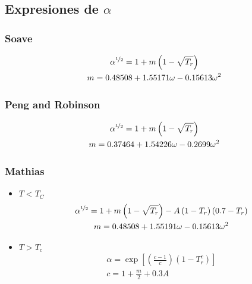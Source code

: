 \subsection{Expresiones de $\alpha$}

\subsubsection{Soave\cite{soave}}

\begin{gather}
	\alpha^{\nicefrac{1}{2}} = 1 + m \left(1-\sqrt{T_r}\right)\\
	m = 0.48508+1.55171\omega-0.15613\omega^2
\end{gather}

\subsubsection{Peng and Robinson \cite{pengRobinson}}


\begin{gather}
	\alpha^{\nicefrac{1}{2}} = 1 + m \left(1-\sqrt{T_r}\right)\\
	m = 0.37464+1.54226\omega-0.2699\omega^2
\end{gather}


\subsubsection{Mathias\cite{mathias} }
\begin{itemize}

\item{$T < T_C$}
\begin{gather}
	\alpha^{\nicefrac{1}{2}} = 1 + m \left(1-\sqrt{T_r}\right)- A\left(1-T_r\right)\left(0.7-T_r\right)
	\\
	m = 0.48508+1.55191\omega-0.15613\omega^2
\end{gather}

\item{$T > T_c$}
\begin{gather}
	\alpha = \exp{\left[ \left( \frac{c-1}{c} \right)  \left(  1- T_r^c  \right)  \right]}\\
	c = 1 + \frac{m}{2} + 0.3 A
\end{gather}

 \end{itemize}





